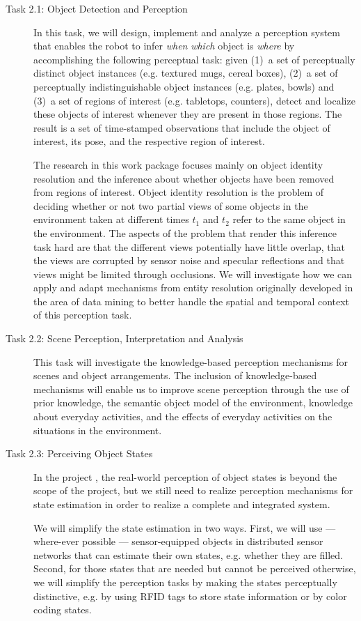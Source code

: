 \begin{description}
\item[Task 2.1: Object Detection and Perception] In this task, we will
  design, implement and analyze a perception system that enables
  the robot to infer \emph{when} \emph{which} object is \emph{where} by
  accomplishing the following perceptual task: given (1)~a set of
  perceptually distinct object instances (e.g. textured mugs, cereal boxes), 
  (2)~a set of perceptually indistinguishable object instances
  (e.g. plates, bowls) and (3)~a set of regions of interest (e.g. tabletops, counters),
  detect and localize these objects of interest whenever they are present in those regions.
  The result is a set of time-stamped observations that
  include the object of interest, its pose, and the respective region of
  interest.

  The research in this work package focuses mainly on object identity resolution 
  and the inference about whether objects have been removed from regions of interest.
  Object identity resolution is the problem of deciding whether or not two partial views
  of some objects in the environment taken at different times $t_1$ and
  $t_2$ refer to the same object in the environment. The aspects of the problem
  that render this inference task hard are that the different views potentially have
  little overlap, that the views are corrupted by sensor
  noise and specular reflections and that views might be limited
  through occlusions. We will investigate how we can apply and adapt
  mechanisms from entity resolution originally developed in the area of data
  mining to better handle the spatial and temporal context
  of this perception task.\\
\item[Task 2.2: Scene Perception, Interpretation and Analysis]
  This task will investigate the knowledge-based perception
  mechanisms for scenes and object arrangements. The inclusion of
  knowledge-based mechanisms will enable us to improve scene perception
  through the use of prior knowledge, the semantic object model of the
  environment, knowledge about everyday activities, and the effects of
  everyday activities on the situations in the environment.
\item[Task 2.3: Perceiving Object States]
  In the project \ksem, the real-world perception of object states is
  beyond the scope of the project, but we still need to realize
  perception mechanisms for state estimation in order to realize a
  complete and integrated system.

  We will simplify the state estimation in two ways. First, we will use
  --- where-ever possible --- sensor-equipped objects in distributed sensor
  networks that can estimate their own states, e.g. whether they are
  filled.
  Second, for those states that are needed but cannot be perceived
  otherwise, we will simplify the perception tasks by making the states
  perceptually distinctive, e.g. by using RFID tags to store state
  information or by color coding states.
\end{description}


